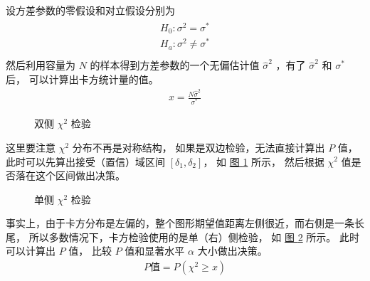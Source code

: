 \documentclass[letterpaper,10pt,english]{sphinxmanual}
\begin{document}
设方差参数的零假设和对立假设分别为
\begin{align}\label{equation:推断与检验/content:推断与检验/content:95}\!\begin{aligned}
H_0: \sigma^2 =\sigma^*\\
H_a: \sigma^2 \neq \sigma^*\\
\end{aligned}\end{align}
然后利用容量为 \(N\) 的样本得到方差参数的一个无偏估计值 \(\hat{\sigma}^2\)
，有了 \(\hat{\sigma}^2\) 和 \(\sigma^*\) 后，
可以计算出卡方统计量的值。
\begin{equation}\label{equation:推断与检验/content:推断与检验/content:96}
\begin{split}x = \frac{N \hat{\sigma}^2}{\sigma^*}\end{split}
\end{equation}
\begin{figure}[htbp]
\centering
\capstart

\noindent{}
\caption{双侧 \(\chi^2\) 检验}\label{\detokenize{_u63a8_u65ad_u4e0e_u68c0_u9a8c/content:id36}}\label{\detokenize{_u63a8_u65ad_u4e0e_u68c0_u9a8c/content:pic-influence-112}}\end{figure}

这里要注意 \(\chi^2\) 分布不再是对称结构，
如果是双边检验，无法直接计算出 \(P\) 值，
此时可以先算出接受（置信）域区间 \([\delta_1,\delta_2]\)，
如 \hyperref[\detokenize{_u63a8_u65ad_u4e0e_u68c0_u9a8c/content:pic-influence-112}]{图 \ref{\detokenize{_u63a8_u65ad_u4e0e_u68c0_u9a8c/content:pic-influence-112}}} 所示，
然后根据 \(\chi^2\) 值是否落在这个区间做出决策。

\begin{figure}[htbp]
\centering
\capstart

\noindent{}
\caption{单侧 \(\chi^2\) 检验}\label{\detokenize{_u63a8_u65ad_u4e0e_u68c0_u9a8c/content:id37}}\label{\detokenize{_u63a8_u65ad_u4e0e_u68c0_u9a8c/content:pic-influence-113}}\end{figure}

事实上，由于卡方分布是左偏的，整个图形期望值距离左侧很近，而右侧是一条长尾，
所以多数情况下，卡方检验使用的是单（右）侧检验，
如 \hyperref[\detokenize{_u63a8_u65ad_u4e0e_u68c0_u9a8c/content:pic-influence-113}]{图 \ref{\detokenize{_u63a8_u65ad_u4e0e_u68c0_u9a8c/content:pic-influence-113}}} 所示。
此时可以计算出 \(P\) 值，
比较 \(P\) 值和显著水平 \(\alpha\)
大小做出决策。
\begin{equation}\label{equation:推断与检验/content:推断与检验/content:97}
\begin{split}P \text{值} = P(\chi^2 \geq x )\end{split}
\end{equation}
\end{document}
